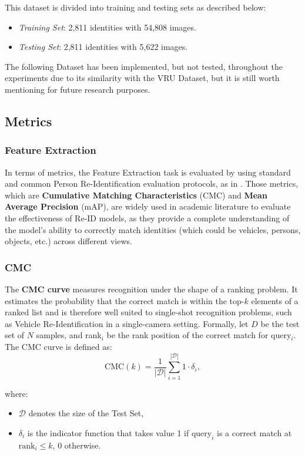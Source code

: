 This dataset is divided into training and testing sets as described below:
\begin{itemize}
    \item \textit{Training Set}: 2,811 identities with 54,808 images.
    \item \textit{Testing Set}: 2,811 identities with 5,622 images.
\end{itemize}

The following Dataset has been implemented, but not tested, throughout the experiments due to its similarity with the VRU Dataset, but it is still worth mentioning for future research purposes.

\subsection{Metrics}
\subsubsection{Feature Extraction}
In terms of metrics, the Feature Extraction task is evaluated by using standard and common Person Re-Identification evaluation protocols, as in \cite{PersonReID}. Those metrics, which are \textbf{Cumulative Matching Characteristics} (CMC) and \textbf{Mean Average Precision} (mAP), are widely used in academic literature to evaluate the effectiveness of Re-ID models, as they provide a complete understanding of the model's ability to correctly match identities (which could be vehicles, persons, objects, etc.) across different views.

\subsubsection{CMC}
The \textbf{CMC curve} measures recognition under the shape of a ranking problem. It estimates the probability that the correct match is within the top-$k$ elements of a ranked list and is therefore well suited to single-shot recognition problems, such as Vehicle Re-Identification in a single-camera setting.
Formally, let $D$ be the test set of $N$ samples, and rank$_{i}$ be the rank position of the correct match for query$_{i}$. The CMC curve is defined as:
\[
    \text{CMC}(k) = \frac{1}{|\mathcal{D}|} \sum_{i=1}^{|\mathcal{D}|} 1 \cdot \delta_{i},
\]

where:
\begin{itemize}
    \item $\mathcal{D}$ denotes the size of the Test Set,
    \item $\delta_{i}$ is the indicator function that takes value 1 if $\text{query}_i$ is a correct match at $\text{rank}_i \leq k $, 0 otherwise.
\end{itemize}

